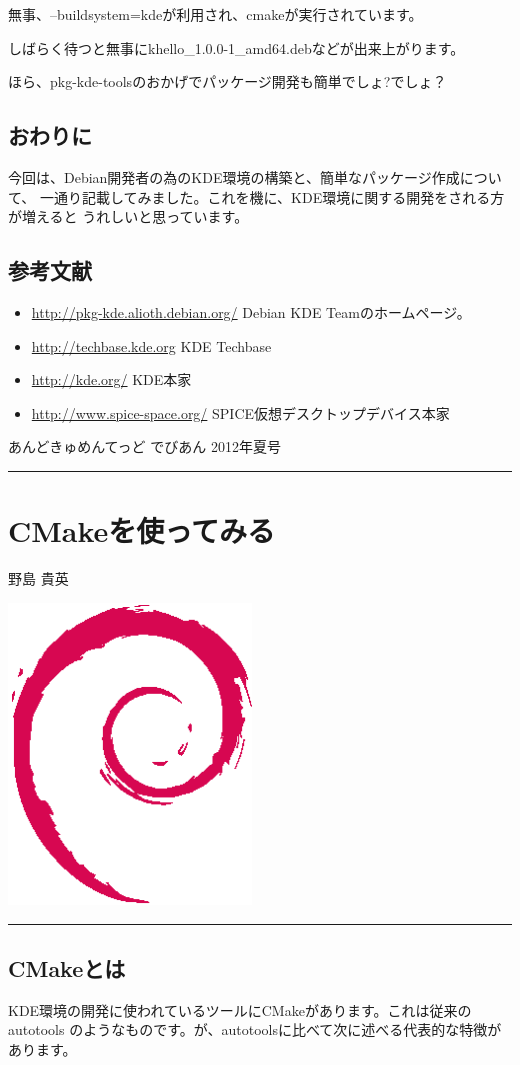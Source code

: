 \documentclass[mingoth,a4paper]{jsarticle}
\renewcommand{\dancersection}[2]{%
\newpage
あんどきゅめんてっど でびあん 2012年夏号
%
\vspace{0.1mm}\\
{\color{dancerdarkblue}\rule{\hsize}{2mm}}

%
%
\begin{minipage}[t]{0.6\hsize}
\color{dancerdarkblue}
\vspace{1cm}
\section{#1}
\hfill{}#2\\
\end{minipage}
\begin{minipage}[t]{0.4\hsize}
\vspace{-2cm}
\hfill{}\includegraphics[height=8cm]{image200502/openlogo-nd.eps}\\
\vspace{-5cm}
\end{minipage}
%
{\color{dancerlightblue}\rule{0.66\hsize}{2mm}}
%
\vspace{2cm}
}
\begin{document}
無事、--buildsystem=kdeが利用され、cmakeが実行されています。

しばらく待つと無事にkhello\_1.0.0-1\_amd64.debなどが出来上がります。

ほら、pkg-kde-toolsのおかげでパッケージ開発も簡単でしょ?でしょ？

\subsection{おわりに}

今回は、Debian開発者の為のKDE環境の構築と、簡単なパッケージ作成について、
一通り記載してみました。これを機に、KDE環境に関する開発をされる方が増えると
うれしいと思っています。

\subsection{参考文献}

\begin{itemize}
\item \url{http://pkg-kde.alioth.debian.org/} Debian KDE Teamのホームページ。
\item \url{http://techbase.kde.org} KDE Techbase
\item \url{http://kde.org/} KDE本家
\item \url{http://www.spice-space.org/} SPICE仮想デスクトップデバイス本家
\end{itemize}

\clearpage
\dancersection{CMakeを使ってみる}{野島 貴英}

\subsection{CMakeとは}

KDE環境の開発に使われているツールにCMakeがあります。これは従来のautotools
のようなものです。が、autotoolsに比べて次に述べる代表的な特徴があります。
\end{document}
